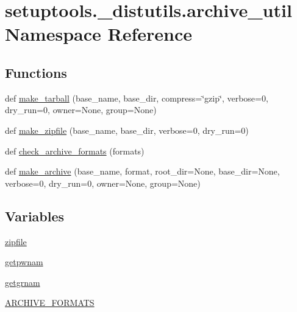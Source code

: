 \hypertarget{namespacesetuptools_1_1__distutils_1_1archive__util}{}\section{setuptools.\+\_\+distutils.\+archive\+\_\+util Namespace Reference}
\label{namespacesetuptools_1_1__distutils_1_1archive__util}
\subsection*{Functions}
\begin{DoxyCompactItemize}
\item 
def \hyperlink{namespacesetuptools_1_1__distutils_1_1archive__util_a3274d5b3e116dba9c44cdf5d0a0713dc}{make\+\_\+tarball} (base\+\_\+name, base\+\_\+dir, compress=\char`\"{}gzip\char`\"{}, verbose=0, dry\+\_\+run=0, owner=None, group=None)
\item 
def \hyperlink{namespacesetuptools_1_1__distutils_1_1archive__util_a38983f08433f7de571d0eef0831aa651}{make\+\_\+zipfile} (base\+\_\+name, base\+\_\+dir, verbose=0, dry\+\_\+run=0)
\item 
def \hyperlink{namespacesetuptools_1_1__distutils_1_1archive__util_a75ae10289c3cf2eca8b6f87af8f61d0e}{check\+\_\+archive\+\_\+formats} (formats)
\item 
def \hyperlink{namespacesetuptools_1_1__distutils_1_1archive__util_a10c09cf11a23f7a364c38cd8e3d201f5}{make\+\_\+archive} (base\+\_\+name, format, root\+\_\+dir=None, base\+\_\+dir=None, verbose=0, dry\+\_\+run=0, owner=None, group=None)
\end{DoxyCompactItemize}
\subsection*{Variables}
\begin{DoxyCompactItemize}
\item 
\hyperlink{namespacesetuptools_1_1__distutils_1_1archive__util_a6039907852b6dd17db8509bbb5f2f31d}{zipfile}
\item 
\hyperlink{namespacesetuptools_1_1__distutils_1_1archive__util_a665584188bac387b92e98b81f64cc0f1}{getpwnam}
\item 
\hyperlink{namespacesetuptools_1_1__distutils_1_1archive__util_a7a62b813e4cfca7274c91f6873d585ca}{getgrnam}
\item 
\hyperlink{namespacesetuptools_1_1__distutils_1_1archive__util_adfd17290be21b0e3d3c1f6a7f7e0b342}{A\+R\+C\+H\+I\+V\+E\+\_\+\+F\+O\+R\+M\+A\+TS}
\end{DoxyCompactItemize}


